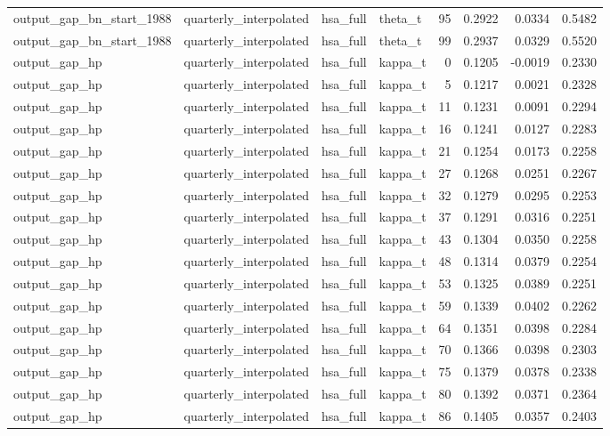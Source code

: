 \begin{tabular}{llllrrrr}
output\_gap\_bn\_start\_1988 & quarterly\_interpolated & hsa\_full & theta\_t & 95 & 0.2922 & 0.0334 & 0.5482 \\
output\_gap\_bn\_start\_1988 & quarterly\_interpolated & hsa\_full & theta\_t & 99 & 0.2937 & 0.0329 & 0.5520 \\
output\_gap\_hp & quarterly\_interpolated & hsa\_full & kappa\_t & 0 & 0.1205 & -0.0019 & 0.2330 \\
output\_gap\_hp & quarterly\_interpolated & hsa\_full & kappa\_t & 5 & 0.1217 & 0.0021 & 0.2328 \\
output\_gap\_hp & quarterly\_interpolated & hsa\_full & kappa\_t & 11 & 0.1231 & 0.0091 & 0.2294 \\
output\_gap\_hp & quarterly\_interpolated & hsa\_full & kappa\_t & 16 & 0.1241 & 0.0127 & 0.2283 \\
output\_gap\_hp & quarterly\_interpolated & hsa\_full & kappa\_t & 21 & 0.1254 & 0.0173 & 0.2258 \\
output\_gap\_hp & quarterly\_interpolated & hsa\_full & kappa\_t & 27 & 0.1268 & 0.0251 & 0.2267 \\
output\_gap\_hp & quarterly\_interpolated & hsa\_full & kappa\_t & 32 & 0.1279 & 0.0295 & 0.2253 \\
output\_gap\_hp & quarterly\_interpolated & hsa\_full & kappa\_t & 37 & 0.1291 & 0.0316 & 0.2251 \\
output\_gap\_hp & quarterly\_interpolated & hsa\_full & kappa\_t & 43 & 0.1304 & 0.0350 & 0.2258 \\
output\_gap\_hp & quarterly\_interpolated & hsa\_full & kappa\_t & 48 & 0.1314 & 0.0379 & 0.2254 \\
output\_gap\_hp & quarterly\_interpolated & hsa\_full & kappa\_t & 53 & 0.1325 & 0.0389 & 0.2251 \\
output\_gap\_hp & quarterly\_interpolated & hsa\_full & kappa\_t & 59 & 0.1339 & 0.0402 & 0.2262 \\
output\_gap\_hp & quarterly\_interpolated & hsa\_full & kappa\_t & 64 & 0.1351 & 0.0398 & 0.2284 \\
output\_gap\_hp & quarterly\_interpolated & hsa\_full & kappa\_t & 70 & 0.1366 & 0.0398 & 0.2303 \\
output\_gap\_hp & quarterly\_interpolated & hsa\_full & kappa\_t & 75 & 0.1379 & 0.0378 & 0.2338 \\
output\_gap\_hp & quarterly\_interpolated & hsa\_full & kappa\_t & 80 & 0.1392 & 0.0371 & 0.2364 \\
output\_gap\_hp & quarterly\_interpolated & hsa\_full & kappa\_t & 86 & 0.1405 & 0.0357 & 0.2403 \\

\end{tabular}
